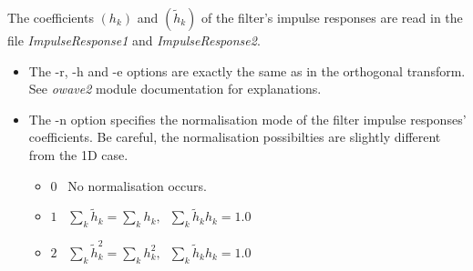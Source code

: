 The coefficients $(h_{k})$ and $(\tilde{h}_{k})$ of the filter's impulse responses are read in the file {\em ImpulseResponse1} and {\em ImpulseResponse2}.

\begin{itemize}
\item
The -r, -h and -e options are exactly the same as in the orthogonal transform.
See {\em owave2} module documentation for explanations. 
\item
The -n option specifies the normalisation mode of the filter impulse responses' coefficients. Be careful, the normalisation possibilties are slightly different from the 1D case.
\begin{itemize}
\item
$0$ \ No normalisation occurs.
\item
$1$ \ $ \sum_{k} \tilde{h}_{k} =  \sum_{k} {h}_{k}, \;\;  \sum_{k} \tilde{h}_{k}{h}_{k} = 1.0$
\item 
$2$ \ $ \sum_{k} \tilde{h}_{k}^2 =  \sum_{k} {h}_{k}^2, \;\;  \sum_{k} \tilde{h}_{k}{h}_{k} = 1.0$
\end{itemize}

\end{itemize}

